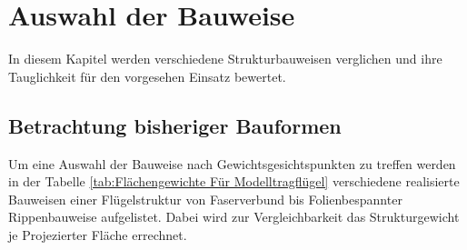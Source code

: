 \chapter{Auswahl der Bauweise}


In diesem Kapitel werden verschiedene Strukturbauweisen verglichen und ihre Tauglichkeit für den vorgesehen Einsatz bewertet.

\section{Betrachtung bisheriger Bauformen}
\label{cha:Statistische Betrachtung bisheriger Bauformen}

Um eine Auswahl der Bauweise nach Gewichtsgesichtspunkten zu treffen werden in der Tabelle \ref{tab:Flächengewichte Für Modelltragflügel} verschiedene realisierte Bauweisen einer Flügelstruktur von Faserverbund bis Folienbespannter Rippenbauweise aufgelistet. Dabei wird zur Vergleichbarkeit das Strukturgewicht je Projezierter Fläche errechnet.

